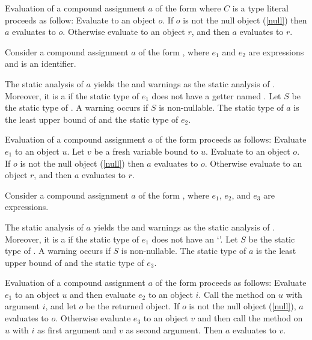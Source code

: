 \documentclass[makeidx]{article}
\begin{document}
{\LMHash{}%
Evaluation of a compound assignment $a$ of the form 
where $C$ is a type literal proceeds as follow:
Evaluate  to an object $o$.
If $o$ is not the null object (\ref{null}) then $a$ evaluates to $o$.
Otherwise evaluate  to an object $r$,
and then $a$ evaluates to $r$.
\EndCase

\LMHash{}%
Consider a compound assignment $a$ of the form ,
where $e_1$ and $e_2$ are expressions and \id{} is an identifier.

\LMHash{}%
The static analysis of $a$ yields
the  and warnings as
the static analysis of .
Moreover, it is a 
if the static type of $e_1$ does not have a getter named \id.
Let $S$ be the static type of .
A warning occurs if $S$ is non-nullable.
The static type of $a$ is the least upper bound of
 and the static type of $e_2$.

\LMHash{}%
Evaluation of a compound assignment $a$ of the form 
proceeds as follows:
Evaluate $e_1$ to an object $u$.
Let $v$ be a fresh variable bound to $u$.
Evaluate  to an object $o$.
If $o$ is not the null object (\ref{null}) then $a$ evaluates to $o$.
Otherwise evaluate  to an object $r$,
and then $a$ evaluates to $r$.
\EndCase

\LMHash{}%
Consider a compound assignment $a$ of the form ,
where $e_1$, $e_2$, and $e_3$ are expressions.

\LMHash{}%
The static analysis of $a$ yields
the  and warnings as
the static analysis of .
Moreover, it is a 
if the static type of $e_1$ does not have an `'.
Let $S$ be the static type of .
A warning occurs if $S$ is non-nullable.
The static type of $a$ is the least upper bound of
 and the static type of $e_3$.

\LMHash{}%
Evaluation of a compound assignment $a$ of the form
proceeds as follows:
Evaluate $e_1$ to an object $u$ and then evaluate $e_2$ to an object $i$.
Call the \code{[]} method on $u$ with argument $i$,
and let $o$ be the returned object.
If $o$ is not the null object (\ref{null}), $a$ evaluates to $o$.
Otherwise evaluate $e_3$ to an object $v$
and then call the \code{[]=} method on $u$
with $i$ as first argument and $v$ as second argument.
Then $a$ evaluates to $v$.
\EndCase

}
\end{document}
